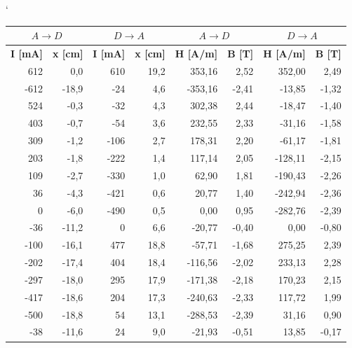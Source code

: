 \documentclass[english]{article}
\begin{document}
			
\begin{table}[htbp]
\catcode` %
  \centering
\begin{tabular}{|r|r|r|r|r|r|r|r|}
\hline
\multicolumn{2}{|c|}{$A\rightarrow D$} & \multicolumn{2}{c|}{$D\rightarrow A$} & \multicolumn{2}{c|}{$A\rightarrow D$} & \multicolumn{2}{c|}{$D\rightarrow A$} \bigstrut\\
\hline
\textbf{I [mA]} & \textbf{x [cm]} & \textbf{I [mA]} & \textbf{x [cm]} & \textbf{H [A/m]} & \textbf{B [T]} & \textbf{H [A/m]} & \textbf{B [T]} \bigstrut\\
\hline
612   & 0,0   & 610   & 19,2  & 353,16 & 2,52  & 352,00 & 2,49 \bigstrut\\
\hline
-612  & -18,9 & -24   & 4,6   & -353,16 & -2,41 & -13,85 & -1,32 \bigstrut\\
\hline
524   & -0,3  & -32   & 4,3   & 302,38 & 2,44  & -18,47 & -1,40 \bigstrut\\
\hline
403   & -0,7  & -54   & 3,6   & 232,55 & 2,33  & -31,16 & -1,58 \bigstrut\\
\hline
309   & -1,2  & -106  & 2,7   & 178,31 & 2,20  & -61,17 & -1,81 \bigstrut\\
\hline
203   & -1,8  & -222  & 1,4   & 117,14 & 2,05  & -128,11 & -2,15 \bigstrut\\
\hline
109   & -2,7  & -330  & 1,0   & 62,90 & 1,81  & -190,43 & -2,26 \bigstrut\\
\hline
36    & -4,3  & -421  & 0,6   & 20,77 & 1,40  & -242,94 & -2,36 \bigstrut\\
\hline
0     & -6,0  & -490  & 0,5   & 0,00  & 0,95  & -282,76 & -2,39 \bigstrut\\
\hline
-36   & -11,2 & 0     & 6,6   & -20,77 & -0,40 & 0,00  & -0,80 \bigstrut\\
\hline
-100  & -16,1 & 477   & 18,8  & -57,71 & -1,68 & 275,25 & 2,39 \bigstrut\\
\hline
-202  & -17,4 & 404   & 18,4  & -116,56 & -2,02 & 233,13 & 2,28 \bigstrut\\
\hline
-297  & -18,0 & 295   & 17,9  & -171,38 & -2,18 & 170,23 & 2,15 \bigstrut\\
\hline
-417  & -18,6 & 204   & 17,3  & -240,63 & -2,33 & 117,72 & 1,99 \bigstrut\\
\hline
-500  & -18,8 & 54    & 13,1  & -288,53 & -2,39 & 31,16 & 0,90 \bigstrut\\
\hline
-38   & -11,6 & 24    & 9,0   & -21,93 & -0,51 & 13,85 & -0,17 \bigstrut\\

\end{tabular}
\end{table}
\end{document}

